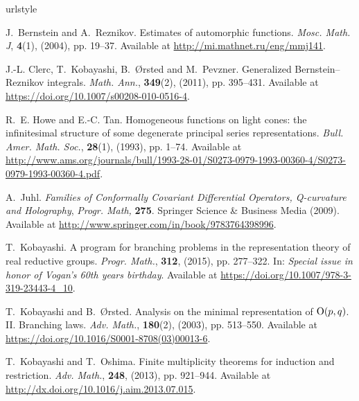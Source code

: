 \begin{thebibliography}{CK{\O}P11}
\expandafter\ifx\csname urlstyle\endcsname\relax
  \providecommand{\doi}[1]{doi:\discretionary{}{}{}#1}\else
  \providecommand{\doi}{doi:\discretionary{}{}{}\begingroup
  \urlstyle{rm}\Url}\fi

J.~Bernstein and A.~Reznikov.
\newblock Estimates of automorphic functions.
\newblock \emph{Mosc. Math. J}, \textbf{\textbf{4}}(1), (2004), pp. 19--37.
Available at \url{http://mi.mathnet.ru/eng/mmj141}.

J.-L. Clerc, T.~Kobayashi, B.~{\O}rsted and M.~Pevzner.
\newblock Generalized {B}ernstein--{R}eznikov integrals.
\newblock \emph{Math. Ann.}, \textbf{349}(2), (2011), pp. 395--431.
Available at \url{https://doi.org/10.1007/s00208-010-0516-4}.

R.~E. Howe and E.-C. Tan.
\newblock Homogeneous functions on light cones: the infinitesimal structure of
  some degenerate principal series representations.
\newblock \emph{Bull. Amer. Math. Soc.}, \textbf{28}(1), (1993), pp. 1--74.
Available at \url{http://www.ams.org/journals/bull/1993-28-01/S0273-0979-1993-00360-4/S0273-0979-1993-00360-4.pdf}.

A.~Juhl.
\newblock \emph{Families of {C}onformally {C}ovariant {D}ifferential
  {O}perators, {Q}-curvature and {H}olography}, \emph{Progr. Math,}
  \textbf{275}.
\newblock Springer Science \& Business Media (2009).
Available at \url{http://www.springer.com/in/book/9783764398996}.

T.~Kobayashi.
\newblock A program for branching problems in the representation theory of real
  reductive groups.
\newblock \emph{Progr. Math.}, \textbf{312}, (2015), pp. 277--322.
\newblock In: \emph{{\normalfont Special issue in honor of Vogan's 60th years
  birthday}}.
Available at \url{https://doi.org/10.1007/978-3-319-23443-4_10}.

T.~Kobayashi and B.~{\O}rsted.
\newblock Analysis on the minimal representation of\/ {$\mbox{\rm O}(p,q)$}.{$\;$}{{\rm{II}}}. {B}ranching laws.
\newblock \emph{Adv. Math.}, \textbf{180}(2), (2003), pp. 513--550.
Available at \url{https://doi.org/10.1016/S0001-8708(03)00013-6}.

T.~Kobayashi and T.~Oshima.
\newblock Finite multiplicity theorems for induction and restriction.
\newblock \emph{Adv. Math.}, \textbf{248}, (2013), pp. 921--944.
Available at \url{http://dx.doi.org/10.1016/j.aim.2013.07.015}.


\end{thebibliography}
